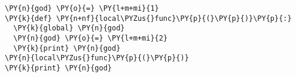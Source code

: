 \begin{Verbatim}[commandchars=\\\{\}]
\PY{n}{god} \PY{o}{=} \PY{l+m+mi}{1}
\PY{k}{def} \PY{n+nf}{local\PYZus{}func}\PY{p}{(}\PY{p}{)}\PY{p}{:}
  \PY{k}{global} \PY{n}{god}
  \PY{n}{god} \PY{o}{=} \PY{l+m+mi}{2}
  \PY{k}{print} \PY{n}{god}
\PY{n}{local\PYZus{}func}\PY{p}{(}\PY{p}{)}
\PY{k}{print} \PY{n}{god}
\end{Verbatim}
